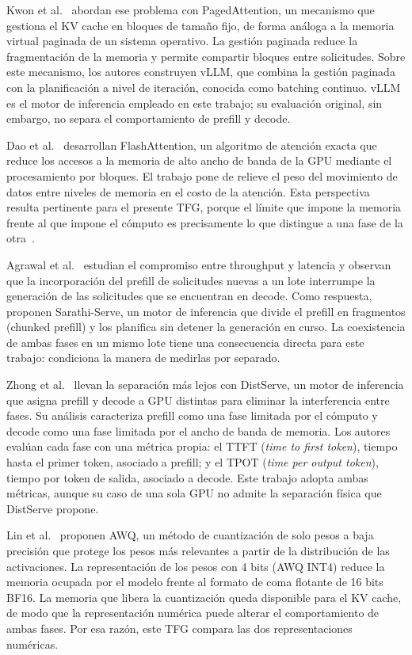 Kwon et al.~\cite{kwon2023pagedattention} abordan ese problema con PagedAttention, un mecanismo que gestiona el KV cache en bloques de tamaño fijo, de forma análoga a la memoria virtual paginada de un sistema operativo. La gestión paginada reduce la fragmentación de la memoria y permite compartir bloques entre solicitudes. Sobre este mecanismo, los autores construyen vLLM, que combina la gestión paginada con la planificación a nivel de iteración, conocida como batching continuo. vLLM es el motor de inferencia empleado en este trabajo; su evaluación original, sin embargo, no separa el comportamiento de prefill y decode.

Dao et al.~\cite{dao2022flashattention} desarrollan FlashAttention, un algoritmo de atención exacta que reduce los accesos a la memoria de alto ancho de banda de la GPU mediante el procesamiento por bloques. El trabajo pone de relieve el peso del movimiento de datos entre niveles de memoria en el costo de la atención. Esta perspectiva resulta pertinente para el presente TFG, porque el límite que impone la memoria frente al que impone el cómputo es precisamente lo que distingue a una fase de la otra~\cite{zhong2024distserve}.

Agrawal et al.~\cite{agrawal2024sarathi} estudian el compromiso entre throughput y latencia y observan que la incorporación del prefill de solicitudes nuevas a un lote interrumpe la generación de las solicitudes que se encuentran en decode. Como respuesta, proponen Sarathi-Serve, un motor de inferencia que divide el prefill en fragmentos (chunked prefill) y los planifica sin detener la generación en curso. La coexistencia de ambas fases en un mismo lote tiene una consecuencia directa para este trabajo: condiciona la manera de medirlas por separado.

Zhong et al.~\cite{zhong2024distserve} llevan la separación más lejos con DistServe, un motor de inferencia que asigna prefill y decode a GPU distintas para eliminar la interferencia entre fases. Su análisis caracteriza prefill como una fase limitada por el cómputo y decode como una fase limitada por el ancho de banda de memoria. Los autores evalúan cada fase con una métrica propia: el TTFT (\textit{time to first token}), tiempo hasta el primer token, asociado a prefill; y el TPOT (\textit{time per output token}), tiempo por token de salida, asociado a decode. Este trabajo adopta ambas métricas, aunque su caso de una sola GPU no admite la separación física que DistServe propone.

Lin et al.~\cite{lin2024awq} proponen AWQ, un método de cuantización de solo pesos a baja precisión que protege los pesos más relevantes a partir de la distribución de las activaciones. La representación de los pesos con 4 bits (AWQ INT4) reduce la memoria ocupada por el modelo frente al formato de coma flotante de 16 bits BF16. La memoria que libera la cuantización queda disponible para el KV cache, de modo que la representación numérica puede alterar el comportamiento de ambas fases. Por esa razón, este TFG compara las dos representaciones numéricas.

